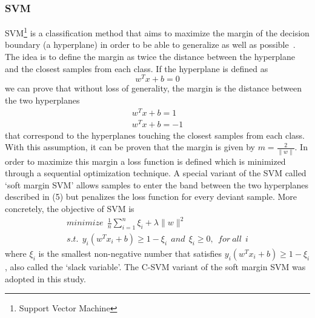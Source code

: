\documentclass[journal,onecolumn]{IEEEtran}
\begin{document}
\subsubsection{SVM}
SVM\footnote{Support Vector Machine} is a classification method that aims to maximize the margin of
the decision boundary (a hyperplane) in order to be able to generalize as well as possible~\cite{svm}.
The idea is to define the margin as twice the distance between the hyperplane and the closest
samples from each class. If the hyperplane is defined as
\begin{equation}
  w^Tx + b = 0
\end{equation}
we can prove that without loss of generality, the margin is the  distance between the two hyperplanes
\begin{equation}
  \begin{gathered}
    w^Tx + b = 1\\
    w^Tx + b = -1
  \end{gathered}
\end{equation}
that correspond to the hyperplanes touching the closest samples from each class. With this assumption,
it can be proven that the margin is given by $m = \frac{2}{\|w\|}$. In order to maximize this margin
a loss function is defined which is minimized through a sequential optimization technique. A special variant of the SVM called
`soft margin SVM' allows samples to enter the band between the two hyperplanes described in (5) but
penalizes the loss function for every deviant sample. More concretely, the objective of SVM is
\begin{equation}
  \begin{gathered}
    minimize~~\frac{1}{n}\sum_{i=1}^n{\xi_i} + \lambda\|w\|^2\\
    s.t.~~ y_i(w^Tx_i + b) \ge 1 - \xi_i ~~and~~ \xi_i\ge 0, ~~ for~all~~i
  \end{gathered}
\end{equation}
where $\xi_i$ is the smallest non-negative number that satisfies $y_i(w^Tx_i + b) \ge 1 - \xi_i$,
also called the `slack variable'. The C-SVM variant of the soft margin SVM was adopted in this study.
\end{document}
